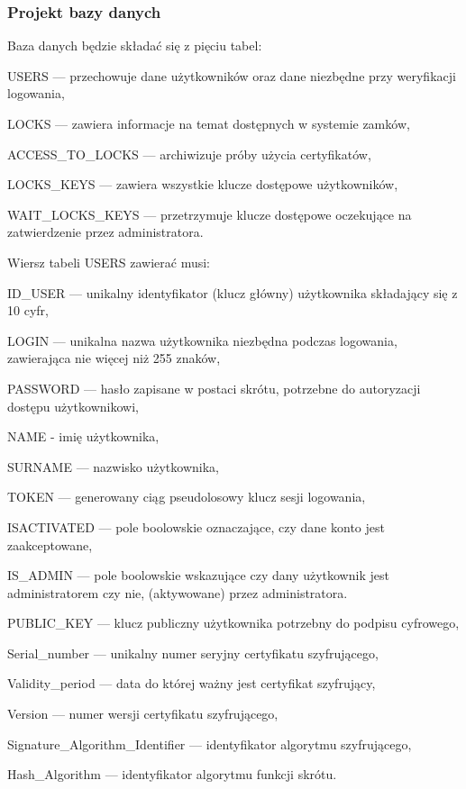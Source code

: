 	\subsubsection{Projekt bazy danych} 
	Baza danych będzie składać się z pięciu tabel:
	\begin{itemize*}
		\item {USERS} --- przechowuje dane użytkowników oraz dane niezbędne przy weryfikacji logowania,
		\item {LOCKS} --- zawiera informacje na temat dostępnych w systemie zamków,
		\item {ACCESS\_TO\_LOCKS} --- archiwizuje próby użycia certyfikatów,
		\item {LOCKS\_KEYS} --- zawiera wszystkie klucze dostępowe użytkowników,
		\item {WAIT\_LOCKS\_KEYS} --- przetrzymuje klucze dostępowe oczekujące na zatwierdzenie przez administratora.
	\end{itemize*}
	
	Wiersz tabeli USERS zawierać musi:
	\begin{itemize*}
		\item {ID\_USER} --- unikalny identyfikator (klucz główny) użytkownika składający się z 10 cyfr,
		\item {LOGIN} --- unikalna nazwa użytkownika niezbędna podczas logowania, zawierająca nie więcej niż 255 znaków,
		\item {PASSWORD} --- hasło zapisane w postaci skrótu, potrzebne do autoryzacji dostępu użytkownikowi,
		\item {NAME} - imię użytkownika,
		\item {SURNAME} --- nazwisko użytkownika,
		\item {TOKEN} --- generowany ciąg pseudolosowy klucz sesji logowania,
		\item  {ISACTIVATED} --- pole boolowskie oznaczające, czy dane konto jest zaakceptowane,
		\item {IS\_ADMIN} --- pole boolowskie wskazujące czy dany użytkownik jest administratorem czy nie, (aktywowane) przez administratora.
		\item {PUBLIC\_KEY} --- klucz publiczny użytkownika potrzebny do podpisu cyfrowego,
		\item Serial\_number --- unikalny numer seryjny certyfikatu szyfrującego,
		\item Validity\_period --- data do której ważny jest certyfikat szyfrujący,
		\item Version --- numer wersji certyfikatu szyfrującego,
		\item Signature\_Algorithm\_Identifier --- identyfikator algorytmu szyfrującego,
		\item Hash\_Algorithm --- identyfikator algorytmu funkcji skrótu.
	\end{itemize*}
	
